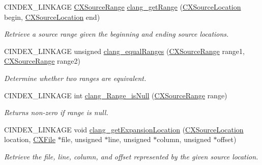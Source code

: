 \begin{DoxyCompactItemize}
\mbox{\label{group__CINDEX__LOCATIONS_ga4e2b6d439f72fdee12c2e4dcf4ff1e2f}} 
C\+I\+N\+D\+E\+X\+\_\+\+L\+I\+N\+K\+A\+GE \mbox{\hyperlink{structCXSourceRange}{C\+X\+Source\+Range}} \mbox{\hyperlink{group__CINDEX__LOCATIONS_ga4e2b6d439f72fdee12c2e4dcf4ff1e2f}{clang\+\_\+get\+Range}} (\mbox{\hyperlink{structCXSourceLocation}{C\+X\+Source\+Location}} begin, \mbox{\hyperlink{structCXSourceLocation}{C\+X\+Source\+Location}} end)
\begin{DoxyCompactList}\small\item\em Retrieve a source range given the beginning and ending source locations. \end{DoxyCompactList}\item 
C\+I\+N\+D\+E\+X\+\_\+\+L\+I\+N\+K\+A\+GE unsigned \mbox{\hyperlink{group__CINDEX__LOCATIONS_ga07e10740b1e867fe4329c6a2df3f9be7}{clang\+\_\+equal\+Ranges}} (\mbox{\hyperlink{structCXSourceRange}{C\+X\+Source\+Range}} range1, \mbox{\hyperlink{structCXSourceRange}{C\+X\+Source\+Range}} range2)
\begin{DoxyCompactList}\small\item\em Determine whether two ranges are equivalent. \end{DoxyCompactList}\item 
\mbox{\label{group__CINDEX__LOCATIONS_ga39213a93703e84c0accdba1f618d7fbb}} 
C\+I\+N\+D\+E\+X\+\_\+\+L\+I\+N\+K\+A\+GE int \mbox{\hyperlink{group__CINDEX__LOCATIONS_ga39213a93703e84c0accdba1f618d7fbb}{clang\+\_\+\+Range\+\_\+is\+Null}} (\mbox{\hyperlink{structCXSourceRange}{C\+X\+Source\+Range}} range)
\begin{DoxyCompactList}\small\item\em Returns non-\/zero if {\ttfamily range} is null. \end{DoxyCompactList}\item 
C\+I\+N\+D\+E\+X\+\_\+\+L\+I\+N\+K\+A\+GE void \mbox{\hyperlink{group__CINDEX__LOCATIONS_gadee4bea0fa34550663e869f48550eb1f}{clang\+\_\+get\+Expansion\+Location}} (\mbox{\hyperlink{structCXSourceLocation}{C\+X\+Source\+Location}} location, \mbox{\hyperlink{group__CINDEX__FILES_gacfcea9c1239c916597e2e5b3e109215a}{C\+X\+File}} $\ast$file, unsigned $\ast$line, unsigned $\ast$column, unsigned $\ast$offset)
\begin{DoxyCompactList}\small\item\em Retrieve the file, line, column, and offset represented by the given source location. \end{DoxyCompactList}\item 

\end{DoxyCompactItemize}
